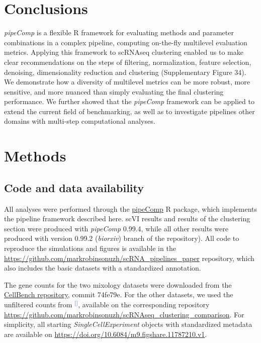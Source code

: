 \documentclass[11pt]{article}
\renewcommand{\cite}[1]{\textcolor{Blue}{$^[$\supercite{#1}$^]$}}
\begin{document}
\section*{Conclusions}

\textit{pipeComp} is a flexible R framework for evaluating methods and parameter combinations in a complex pipeline, computing on-the-fly multilevel evaluation metrics. Applying this framework to scRNAseq clustering enabled us to make {\color{red}clear} recommendations on the steps of filtering, normalization, feature selection, denoising, dimensionality reduction and clustering (Supplementary Figure 34). We demonstrate how a diversity of multilevel metrics can be more robust, more sensitive, and more nuanced than simply evaluating the final clustering performance. We {\color{red}further showed} that the \textit{pipeComp} framework can be applied to extend the current field of benchmarking, as well as to investigate pipelines other domains with multi-step computational analyses.

\section*{Methods}

\subsection*{Code and data availability}

All analyses were performed through the \href{https://github.com/plger/pipeComp}{pipeComp} R package, which implements the pipeline framework described here. scVI results and results of the clustering section were produced with \textit{pipeComp} 0.99.4, while all other results were produced with version 0.99.2 (\textit{biorxiv}) branch of the repository). All code to reproduce the simulations and figures is available in the \url{https://github.com/markrobinsonuzh/scRNA\_pipelines\_paper} repository, which also includes the basic datasets with a standardized annotation.

The gene counts for the two mixology datasets were downloaded from the  \href{https://github.com/LuyiTian/CellBench_data/data/sincell_with_class.RData}{CellBench repository}, commit 74fe79e. For the other datasets, we used the unfiltered counts from \cite{duoClustering2018}, available on the corresponding repository \url{https://github.com/markrobinsonuzh/scRNAseq\_clustering\_comparison}. For simplicity, all starting \textit{SingleCellExperiment} objects with standardized metadata are available on \url{https://doi.org/10.6084/m9.figshare.11787210.v1}.
\end{document}
